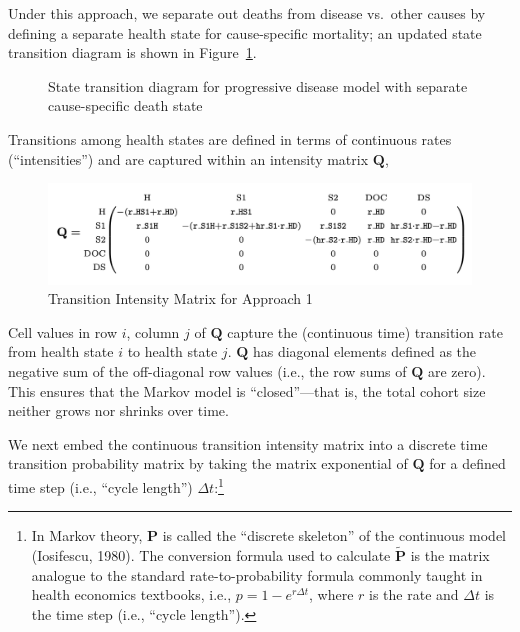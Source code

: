 \documentclass[
]{agujournal2019}
\begin{document}
Under this approach, we separate out deaths from disease vs.~other
causes by defining a separate health state for cause-specific mortality;
an updated state transition diagram is shown in
Figure~\ref{fig-modelDS}.

\begin{figure}


\caption{\label{fig-modelDS}State transition diagram for progressive
disease model with separate cause-specific death state}

\end{figure}%

Transitions among health states are defined in terms of continuous rates
(``intensities'') and are captured within an intensity matrix
\(\mathbf{Q}\),

\begin{figure}[H]

{\centering \includegraphics{images/Q_model2.png}

}

\caption{Transition Intensity Matrix for Approach 1}

\end{figure}%

Cell values in row \(i\), column \(j\) of \(\mathbf{Q}\) capture the
(continuous time) transition rate from health state \(i\) to health
state \(j\). \(\mathbf{Q}\) has diagonal elements defined as the
negative sum of the off-diagonal row values (i.e., the row sums of
\(\mathbf{Q}\) are zero). This ensures that the Markov model is
``closed''---that is, the total cohort size neither grows nor shrinks
over time.

We next embed the continuous transition intensity matrix into a discrete
time transition probability matrix by taking the matrix exponential of
\(\mathbf{Q}\) for a defined time step (i.e., ``cycle length'')
\(\Delta t\):\footnote{In Markov theory, \(\mathbf{P}\) is called the
  ``discrete skeleton'' of the continuous model (Iosifescu, 1980). The
  conversion formula used to calculate \(\widetilde{\mathbf{P}}\) is the
  matrix analogue to the standard rate-to-probability formula commonly
  taught in health economics textbooks, i.e., \(p = 1 - e^{r\Delta t}\),
  where \(r\) is the rate and \(\Delta t\) is the time step (i.e.,
  ``cycle length'').}
\end{document}

